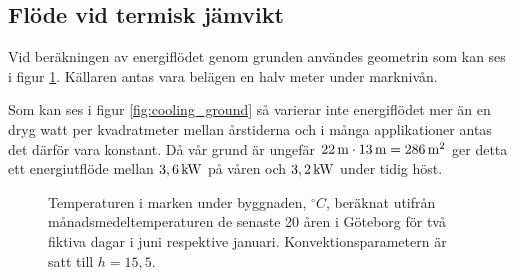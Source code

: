 \subsection{Flöde vid termisk jämvikt}

Vid beräkningen av energiflödet genom grunden användes geometrin som kan ses i figur \ref{fig:groundheat}. Källaren antas vara belägen en halv meter under marknivån.

Som kan ses i figur \ref{fig:cooling_ground} så varierar inte energiflödet mer än en dryg watt per kvadratmeter mellan årstiderna och i många applikationer antas det därför vara konstant. Då vår grund är ungefär $\unit[22]{m}\cdot\unit[13]{m}=\unit[286]{m^2}$ ger detta ett energiutflöde mellan $\unit[3,6]{kW}$ på våren och $\unit[3,2]{kW}$ under tidig höst. 



\begin{figure}
\centering
{}
\caption{\label{fig:groundheat}
Temperaturen i marken under byggnaden, $\unit{^\circ C}$, beräknat utifrån månadsmedeltemperaturen de senaste 20 åren i Göteborg för två fiktiva dagar i juni respektive januari. Konvektionsparametern är satt till $h=15,5$. }
\end{figure}



